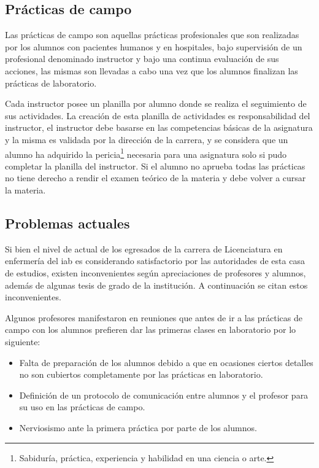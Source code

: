 \subsection{Prácticas de campo}

Las prácticas de campo son aquellas prácticas profesionales que son realizadas
por los alumnos con pacientes humanos y en hospitales, bajo supervisión de un
profesional denominado instructor y bajo una continua evaluación de sus
acciones, las mismas son llevadas a cabo una vez que los alumnos finalizan las
prácticas de laboratorio.

Cada instructor posee un planilla por alumno donde se realiza el seguimiento de
sus actividades. La creación de esta planilla de actividades es responsabilidad
del instructor, el instructor debe basarse en las competencias básicas de la
asignatura y la misma es validada por la dirección de la carrera, y se considera
que un alumno ha adquirido la pericia\footnote{Sabiduría, práctica, experiencia
    y habilidad en una ciencia o arte.} necesaria para una asignatura solo si
pudo completar la planilla del instructor. Si el alumno no aprueba todas las
prácticas no tiene derecho a rendir el examen teórico de la materia y debe
volver a cursar la materia.

\subsection{Problemas actuales}

Si bien el nivel de actual de los egresados de la carrera de Licenciatura en
enfermería del \gls{iab} es considerando satisfactorio por las autoridades de
esta casa de estudios, existen inconvenientes según apreciaciones de profesores
y alumnos, además de algunas tesis de grado de la institución. A continuación se
citan estos inconvenientes.

Algunos profesores manifestaron en reuniones que antes de ir a las prácticas de
campo con los alumnos prefieren dar las primeras clases en laboratorio por lo
siguiente:

\begin{itemize}
\item Falta de preparación de los alumnos debido a que en ocasiones 
ciertos detalles no son cubiertos completamente por las prácticas en 
laboratorio.
\item Definición de un protocolo de comunicación entre alumnos y el 
profesor para su uso en las prácticas de campo.
\item Nerviosismo ante la primera práctica por parte de los alumnos.
\end{itemize}

